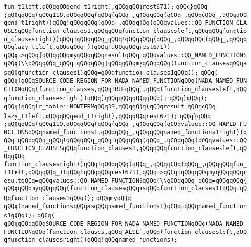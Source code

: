 \verb|fun_t1left,qQQqqQQqend_t1right),qQQqqQQqrest671);|\newline
\verb|qQQq}qQQq|\newline
\verb|;qQQqqQQq(qQQq118,qQQqqQQq(qQQq(qQQq_,qQQqqQQq(qQQq_,qQQqqQQq_,qQQqqQQqend_t1right))qQQq!qQQqqQQq(qQQq_,qQQqqQQq(qQQqvalues::QQ_FUNCTION_CLAUSESqQQqfunction_clauses1,qQQqqQQqfunction_clausesleft,qQQqqQQqfunction_clausesright))qQQq!qQQqqQQq_qQQq!qQQqqQQq(qQQq_,qQQqqQQq(qQQq_,qQQqqQQqlazy_t1left,qQQqqQQq_))qQQq!qQQqqQQqrest671))|\newline
\verb|qQQq=>qQQq{qQQqqQQqmyqQQqqQQqresultqQQq=qQQqvalues::QQ_NAMED_FUNCTIONSqQQq(\\qQQqqQQq_qQQq=qQQqqQQq{qQQqqQQqmyqQQqqQQq(function_clausesqQQqasqQQqfunction_clauses1)qQQq=qQQqfunction_clauses1qQQq();|\newline
\verb|qQQq(|\newline
\verb|qQQq[qQQqSOURCE_CODE_REGION_FOR_NADA_NAMED_FUNCTIONqQQq(NADA_NAMED_FUNCTIONqQQq(function_clauses,qQQqTRUEqQQq),qQQq(function_clausesleft,qQQqfunction_clausesright))qQQq]qQQqqQQqqQQqqQQq);|\newline
\verb|qQQq}qQQq);|\newline
\verb|qQQq(qQQqlr_table::NONTERMqQQq39,qQQqqQQq(qQQqresult,qQQqqQQq|\newline
\verb|lazy_t1left,qQQqqQQqend_t1right),qQQqqQQqrest671);|\newline
\verb|qQQq}qQQq|\newline
\verb|;qQQqqQQq(qQQq119,qQQqqQQq(qQQq(qQQq_,qQQqqQQq(qQQqvalues::QQ_NAMED_FUNCTIONSqQQqnamed_functions1,qQQqqQQq_,qQQqqQQqnamed_functions1right))qQQq!qQQqqQQq_qQQq!qQQqqQQq_qQQq!qQQqqQQq(qQQq_,qQQqqQQq(qQQqvalues::QQ_FUNCTION_CLAUSESqQQqfunction_clauses1,qQQqqQQqfunction_clausesleft,qQQqqQQq|\newline
\verb|function_clausesright))qQQq!qQQqqQQq(qQQq_,qQQqqQQq(qQQq_,qQQqqQQqfun_t1left,qQQqqQQq_))qQQq!qQQqqQQqrest671))qQQq=>qQQq{qQQqqQQqmyqQQqqQQqresultqQQq=qQQqvalues::QQ_NAMED_FUNCTIONSqQQq(\\qQQqqQQq_qQQq=qQQqqQQq{qQQqqQQqmyqQQqqQQq(function_clausesqQQqasqQQqfunction_clauses1)qQQq=qQQqfunction_clauses1qQQq();|\newline
\verb|qQQqmyqQQq|\newline
\verb|qQQq(named_functionsqQQqasqQQqnamed_functions1)qQQq=qQQqnamed_functions1qQQq();|\newline
\verb|qQQq(|\newline
\verb|qQQqqQQqqQQqSOURCE_CODE_REGION_FOR_NADA_NAMED_FUNCTIONqQQq(NADA_NAMED_FUNCTIONqQQq(function_clauses,qQQqFALSE),qQQq(function_clausesleft,qQQqfunction_clausesright))qQQq!qQQqnamed_functions);|\newline
